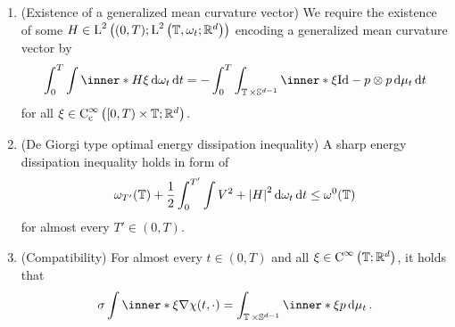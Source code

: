 \begin{definition}
\begin{enumerate}
		\item (Existence of a generalized mean curvature vector)
		We require the existence of some 
		$ H \in \operatorname{L}^{ 2 } \left( 
			( 0 , T ) ; 
			\operatorname{L}^{ 2 } \left(
				\operatorname{\mathbb{T}} , \omega_{ t } ; \mathbb{ R }^{ d }
			\right)
			\right) $
		encoding a generalized mean curvature vector by
		\begin{equation}
			\label{equation_varifold_mean_curvature}
			\int_{ 0 }^{ T }
				\int
					\inner*{ H }{ \xi }
				\dd{ \omega_{ t } }
			\dd{ t }
			=
			-
			\int_{ 0 }^{ T }
				\int_{ \flattorus \times \mathbb{ S }^{ d - 1 } }
					\inner*{ \xi }{ \mathrm{Id} - p \otimes p }
				\dd{ \mu_{ t } }
			\dd{ t }
		\end{equation}
		for all $ \xi \in \operatorname{C}_{ \mathrm{c} }^{ \infty } \left( [ 0, T ) 
		\times \operatorname{\mathbb{T}} ; \mathbb{ R }^{ d } \right) $.
		
		\item (De Giorgi type optimal energy dissipation inequality)
		A sharp energy dissipation inequality holds in form of
		\begin{equation}
			\label{equation_varifold_de_giorgi_inequality}
			\omega_{ T' } ( \operatorname{\mathbb{T}} )
			+
			\frac{ 1 }{ 2 }
			\int_{ 0 }^{ T' }
				\int
					V^{ 2 }
					+
					\abs{ H }^{ 2 }
				\dd{ \omega_{ t } }
			\dd{ t }
			\leq
			\omega^{ 0 } ( \operatorname{\mathbb{T}} )
		\end{equation}
		for almost every $ T' \in ( 0 , T ) $.
		
		\item (Compatibility)
		For almost every $ t \in ( 0 , T ) $ and all $ \xi \in \operatorname{C}^{ 
		\infty } \left( \operatorname{\mathbb{T}} ; \mathbb{ R }^{ d } \right) $, it holds that
		\begin{equation}
			\label{equation_varifold_compatibility}
			\sigma
			\int
				\inner*{ \xi }
				{ \nabla \chi ( t , \cdot ) }
			=
			\int_{ \flattorus \times \mathbb{ S }^{ d - 1 } }
				\inner*{ \xi }{ p }
			\dd{ \mu_{ t } }.
		\end{equation}
	\end{enumerate}
\end{definition}

